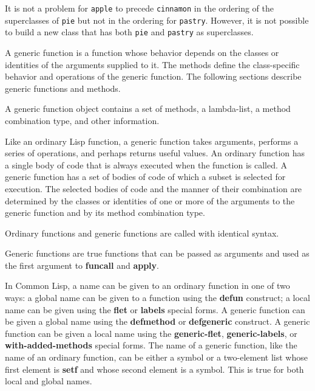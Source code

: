 It is not a problem for {\tt apple} to precede {\tt cinnamon} in the
ordering of the superclasses of {\tt pie} but not in the ordering for
{\tt pastry}.  However, it is not possible to build a new class that
has both {\tt pie} and {\tt pastry} as superclasses.

\endsubSection%

\endSection%



A {\bit generic function\/} is a function whose behavior depends on
the classes or identities of the arguments supplied to it.  The {\bit
methods} define the class-specific behavior and operations of the
generic function. The following sections describe generic functions
and methods.


A generic function object contains a set of methods, a
lambda-list, a method combination type, and other information.

Like an ordinary Lisp function, a generic function takes arguments,
performs a series of operations, and perhaps returns useful values.
An ordinary function has a single body of code that is always executed
when the function is called.  A generic function has a set of bodies
of code of which a subset is selected for execution. The selected
bodies of code and the manner of their combination are determined by
the classes or identities of one or more of the arguments to the
generic function and by its method combination type.

Ordinary functions and generic functions are called with identical
syntax.
 
Generic functions are true functions that can be passed as arguments and
used as the first argument to {\bf funcall} and {\bf apply}.

In Common Lisp, a name can be given to an ordinary function in one of
two ways: a {\bit global\/} name can be given to a function using the
{\bf defun} construct; a {\bit local\/} name can be given using the
{\bf flet} or {\bf labels} special forms.  A generic function can be
given a global name using the {\bf defmethod} or {\bf defgeneric}
construct.  A generic function can be given a local name using the
{\bf generic-flet}, {\bf generic-labels}, or {\bf with-added-methods}
special forms.  The name of a generic function, like the name of an
ordinary function, can be either a symbol or a two-element list whose
first element is {\bf setf} and whose second element is a symbol.
This is true for both local and global names.

